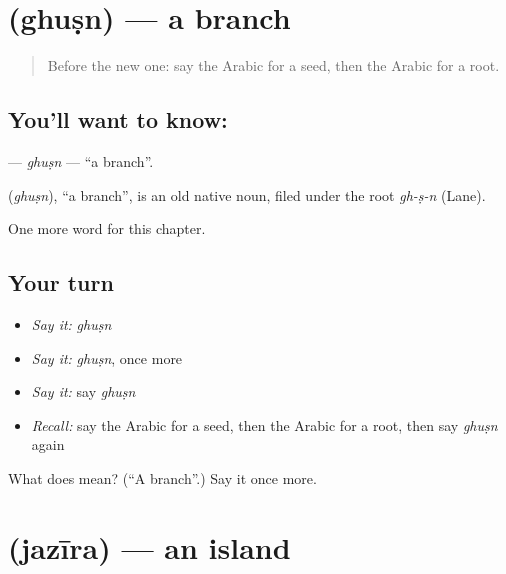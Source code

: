 \section[\texorpdfstring{\ar{غصن} (ghuṣn)}{غصن (ghuṣn)}]{ (ghuṣn) — a branch}

\label{lesson:AR-C131-ghusn}



\begin{quote}
Before the new one: say the Arabic for a seed, then the Arabic for a root.
\end{quote}

\subsection*{You'll want to know: }
\textbf{} — \emph{ghuṣn} — \textquotedblleft{}a branch\textquotedblright{}.

\begin{cousinweb}
\textbf{} (\emph{ghuṣn}), \textquotedblleft{}a branch\textquotedblright{}, is an old native noun, filed under the root \emph{gh-ṣ-n} (Lane).
\end{cousinweb}

\begin{grammarlens}[title={What you've built}]
One more word for this chapter.
\end{grammarlens}

\subsection*{Your turn}
\begin{itemize}
\raggedright
  \item \emph{Say it:} \emph{ghuṣn}
  \item \emph{Say it:} \emph{ghuṣn}, once more
  \item \emph{Say it:} say \emph{ghuṣn}
  \item \emph{Recall:} say the Arabic for a seed, then the Arabic for a root, then say \emph{ghuṣn} again
\end{itemize}

\begin{tcolorbox}[breakable,colback=teal!4,colframe=teal!35!black,title={Before you move on}]
What does  mean? (\textquotedblleft{}A branch\textquotedblright{}.) Say it once more.
\end{tcolorbox}
\section[\texorpdfstring{\ar{جزيرة} (jazīra)}{جزيرة (jazīra)}]{ (jazīra) — an island}

